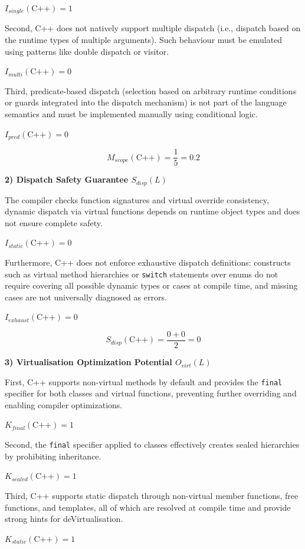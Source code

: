 $I_{single}(\text{C++})=1$

Second, C++ does not natively support multiple dispatch (i.e., dispatch based on the runtime types of multiple arguments). Such behaviour must be emulated using patterns like double dispatch or visitor.

$I_{multi}(\text{C++})=0$

Third, predicate-based dispatch (selection based on arbitrary runtime conditions or guards integrated into the dispatch mechanism) is not part of the language semantics and must be implemented manually using conditional logic.

$I_{pred}(\text{C++})=0$

\[
    M_{scope}(\text{C++}) = \frac{1}{5} = 0.2
\]

\textbf{2) Dispatch Safety Guarantee $S_{disp}(L)$}

The compiler checks function signatures and virtual override consistency, dynamic dispatch via virtual functions depends on runtime object types and does not ensure complete safety.

$I_{static}(\text{C++}) = 0$

Furthermore, C++ does not enforce exhaustive dispatch definitions: constructs such as virtual method hierarchies or \texttt{switch} statements over enums do not require covering all possible dynamic types or cases at compile time, and missing cases are not universally diagnosed as errors.

$I_{exhaust}(\text{C++}) = 0$

\[
    S_{disp}(\text{C++}) = \frac{0 + 0}{2} = 0
\]

\textbf{3) Virtualisation Optimization Potential $O_{virt}(L)$}

First, C++ supports non-virtual methods by default and provides the \texttt{final} specifier for both classes and virtual functions, preventing further overriding and enabling compiler optimizations.

$K_{final}(\text{C++})=1$

Second, the \texttt{final} specifier applied to classes effectively creates sealed hierarchies by prohibiting inheritance.

$K_{sealed}(\text{C++})=1$

Third, C++ supports static dispatch through non-virtual member functions, free functions, and templates, all of which are resolved at compile time and provide strong hints for deVirtualisation.

$K_{static}(\text{C++})=1$

